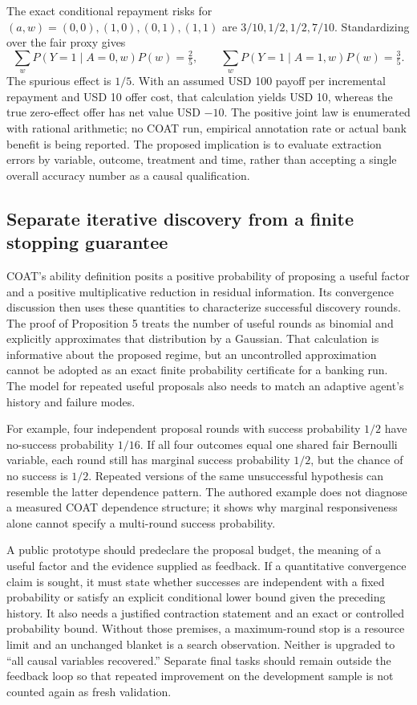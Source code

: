 The exact conditional repayment risks for $(a,w)=(0,0),(1,0),(0,1),(1,1)$
are $3/10,1/2,1/2,7/10$. Standardizing over the fair proxy gives
\begin{equation}
 \sum_w P(Y=1\mid A=0,w)P(w)=\tfrac25,
 \qquad
 \sum_w P(Y=1\mid A=1,w)P(w)=\tfrac35.
 \label{exec19:coat-proxy-effect}
\end{equation}
The spurious effect is $1/5$. With an assumed USD 100 payoff per incremental
repayment and USD 10 offer cost, that calculation yields USD 10, whereas the
true zero-effect offer has net value USD $-10$. The positive joint law is
enumerated with rational arithmetic; no COAT run, empirical annotation rate
or actual bank benefit is being reported. The proposed implication is to
evaluate extraction errors by variable, outcome, treatment and time, rather
than accepting a single overall accuracy number as a causal qualification.
\citep{exec19_coat_reference}

\subsection{Separate iterative discovery from a finite stopping guarantee}
\label{exec19:coat-attempts}
COAT's ability definition posits a positive probability of proposing a useful
factor and a positive multiplicative reduction in residual information. Its
convergence discussion then uses these quantities to characterize successful
discovery rounds. The proof of Proposition 5 treats the number of useful rounds
as binomial and explicitly approximates that distribution by a Gaussian.
That calculation is informative about the proposed regime, but an
uncontrolled approximation cannot be adopted as an exact finite probability
certificate for a banking run. The model for repeated useful proposals also
needs to match an adaptive agent's history and failure modes.~\citep{exec19_coat}

For example, four independent proposal rounds with success probability $1/2$
have no-success probability $1/16$. If all four outcomes equal one shared
fair Bernoulli variable, each round still has marginal success probability
$1/2$, but the chance of no success is $1/2$. Repeated versions of the same
unsuccessful hypothesis can resemble the latter dependence pattern. The
authored example does not diagnose a measured COAT dependence structure; it
shows why marginal responsiveness alone cannot specify a multi-round success
probability.~\citep{exec19_coat_reference}

A public prototype should predeclare the proposal budget, the meaning of a
useful factor and the evidence supplied as feedback. If a quantitative
convergence claim is sought, it must state whether successes are independent
with a fixed probability or satisfy an explicit conditional lower bound given
the preceding history. It also needs a justified contraction statement and an
exact or controlled probability bound. Without those premises, a maximum-round
stop is a resource limit and an unchanged blanket is a search observation.
Neither is upgraded to ``all causal variables recovered.'' Separate final
tasks should remain outside the feedback loop so that repeated improvement on
the development sample is not counted again as fresh validation.

